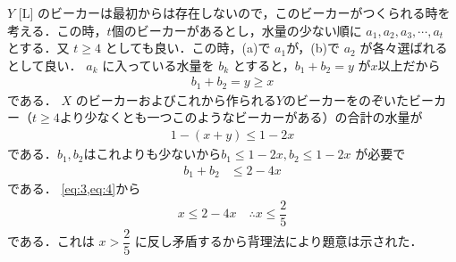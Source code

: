 \documentclass[../../main.tex]{subfiles}
\begin{document}
$Y$ [L] のビーカーは最初からは存在しないので，このビーカーがつくられる時を考える．この時，$t$個のビーカーがあるとし，水量の少ない順に $a_1, a_2, a_3,\cdots,a_t$ とする．又 $t \ge 4$ としても良い．この時，(a)で $a_1$が，(b)で $a_2$ が各々選ばれるとして良い．
$a_k$ に入っている水量を $b_k$ とすると，$b_1+b_2 = y$ が$x$以上だから
\begin{align}
  b_1+b_2 = y \ge x \label{eq:3}
\end{align}
である．
$X$ のビーカーおよびこれから作られる$Y$のビーカーをのぞいたビーカー（$t \ge 4$より少なくとも一つこのようなビーカーがある）の合計の水量が
\begin{align}
  1- (x+y) \le 1-2x
\end{align}
である．$b_1,b_2$はこれよりも少ないから$b_1 \le 1-2x, b_2 \le 1-2x$ が必要で
\begin{align}
  b_1+b_2 &\le 2-4x \label{eq:4}
\end{align}
である．
\cref{eq:3,eq:4}から
\begin{align}
  x \le 2-4x \quad \therefore x \le \dfrac{2}{5}
\end{align}
である．これは $x > \dfrac{2}{5}$ に反し矛盾するから背理法により題意は示された．
\end{document}
